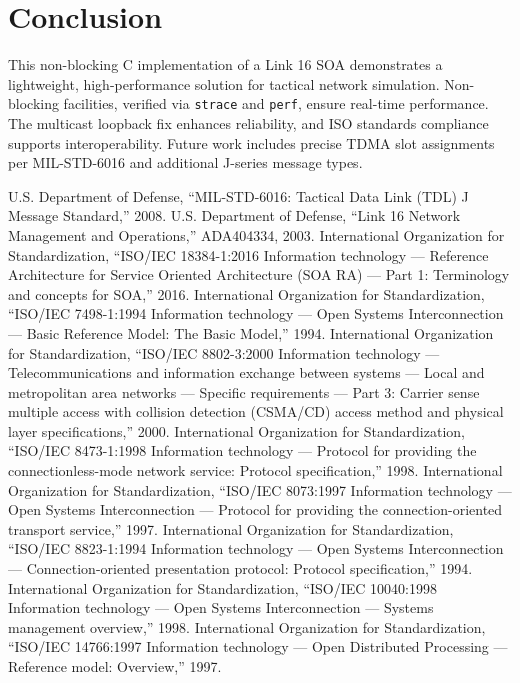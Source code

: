 \documentclass{article}
\begin{document}
\section{Conclusion}
This non-blocking C implementation of a Link 16 SOA demonstrates a lightweight, high-performance solution for tactical network simulation. Non-blocking facilities, verified via \texttt{strace} and \texttt{perf}, ensure real-time performance. The multicast loopback fix enhances reliability, and ISO standards compliance supports interoperability. Future work includes precise TDMA slot assignments per MIL-STD-6016 and additional J-series message types.

\begin{thebibliography}{10}

 U.S. Department of Defense, ``MIL-STD-6016: Tactical Data Link (TDL) J Message Standard,'' 2008.
 U.S. Department of Defense, ``Link 16 Network Management and Operations,'' ADA404334, 2003.
 International Organization for Standardization, ``ISO/IEC 18384-1:2016 Information technology — Reference Architecture for Service Oriented Architecture (SOA RA) — Part 1: Terminology and concepts for SOA,'' 2016.
 International Organization for Standardization, ``ISO/IEC 7498-1:1994 Information technology — Open Systems Interconnection — Basic Reference Model: The Basic Model,'' 1994.
 International Organization for Standardization, ``ISO/IEC 8802-3:2000 Information technology — Telecommunications and information exchange between systems — Local and metropolitan area networks — Specific requirements — Part 3: Carrier sense multiple access with collision detection (CSMA/CD) access method and physical layer specifications,'' 2000.
 International Organization for Standardization, ``ISO/IEC 8473-1:1998 Information technology — Protocol for providing the connectionless-mode network service: Protocol specification,'' 1998.
 International Organization for Standardization, ``ISO/IEC 8073:1997 Information technology — Open Systems Interconnection — Protocol for providing the connection-oriented transport service,'' 1997.
 International Organization for Standardization, ``ISO/IEC 8823-1:1994 Information technology — Open Systems Interconnection — Connection-oriented presentation protocol: Protocol specification,'' 1994.
 International Organization for Standardization, ``ISO/IEC 10040:1998 Information technology — Open Systems Interconnection — Systems management overview,'' 1998.
 International Organization for Standardization, ``ISO/IEC 14766:1997 Information technology — Open Distributed Processing — Reference model: Overview,'' 1997.

\end{thebibliography}
\end{document}
